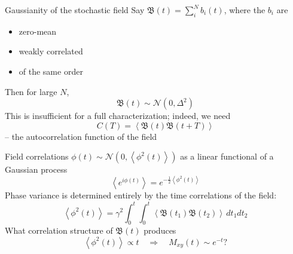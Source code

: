 \documentclass[aspectratio=169,xcolor=dvipsnames]{beamer}
\begin{document}

\begin{frame}{Gaussianity of the stochastic field}
    Say $\mathfrak{B}(t) = \sum_i^N b_i (t)$, where the $b_i$ are
    \begin{itemize}
        \item zero-mean
        \item weakly correlated
        \item of the same order
    \end{itemize}
    Then for large $N$,
    \begin{equation*}
        \mathfrak{B}(t) \sim \mathcal{N}\left(0, \Delta^2 \right)
    \end{equation*}
    This is insufficient for a full characterization; indeed, we need
    \begin{equation*}
        C(T) = \left\langle \mathfrak{B}(t) \mathfrak{B}(t+T)\right\rangle
    \end{equation*}
    -- the autocorrelation function of the field
\end{frame}


\begin{frame}{Field correlations}
    $\phi (t)\sim\mathcal{N}\left(0,\left\langle \phi^2(t)\right\rangle\right)$ as a linear functional of a Gaussian process
    \begin{equation*}
        \left\langle e^{i\phi (t)}\right\rangle = e^{-\frac{1}{2}\left\langle \phi^2(t)\right\rangle}
    \end{equation*}
    Phase variance is determined entirely by the time correlations of the field:
    \begin{equation*}
        \left\langle\phi^2(t)\right\rangle = \gamma^2\int_0^t \int_0^t \left\langle \mathfrak{B}(t_1) \mathfrak{B}(t_2)\right\rangle\,dt_1dt_2
    \end{equation*}
    What correlation structure of $\mathfrak{B}(t)$ produces 
    \begin{equation*}
        \left\langle \phi^2(t)\right\rangle \propto t \quad\Longrightarrow\quad M_{xy}(t)\sim e^{-t}?
    \end{equation*}
\end{frame}

\end{document}
